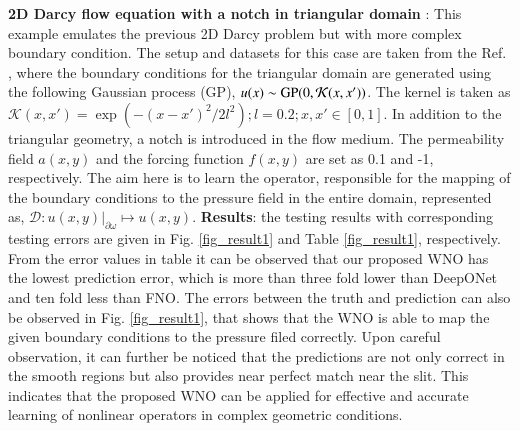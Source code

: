\documentclass{article}
\begin{document}
\textbf{2D Darcy flow equation with a notch in triangular domain }:
This example emulates the previous 2D Darcy problem but with more complex boundary condition. The setup and datasets for this case are taken from the Ref. \cite{lu2022comprehensive}, where the boundary conditions for the triangular domain are generated using the following Gaussian process (GP),
$u(x) \sim {\rm{GP}}(0, \mathcal{K}(x,x'))$. The kernel is taken as $\mathcal{K}(x,x') = \exp \left(-{(x-x')^2}/{2l^2} \right); l=0.2; x,x' \in [0,1]$.
In addition to the triangular geometry, a notch is introduced in the flow medium. The permeability field $a(x,y)$ and the forcing function $f(x,y)$ are set as 0.1 and -1, respectively. The aim here is to learn the operator, responsible for the mapping of the boundary conditions to the pressure field in the entire domain, represented as, $\mathcal{D}: u(x,y)|_{\partial \omega} \mapsto u(x,y)$. 
\textbf{Results}: the testing results with corresponding testing errors are given in Fig. \ref{fig_result1} and Table \ref{fig_result1}, respectively. From the error values in table it can be observed that our proposed WNO has the lowest prediction error, which is more than three fold lower than DeepONet and ten fold less than FNO. The errors between the truth and prediction can also be observed in Fig. \ref{fig_result1}, that shows that the WNO is able to map the given boundary conditions to the pressure filed correctly. Upon careful observation, it can further be noticed that the predictions are not only correct in the smooth regions but also provides near perfect match near the slit. This indicates that the proposed WNO can be applied for effective and accurate learning of nonlinear operators in complex geometric conditions.
\end{document}
